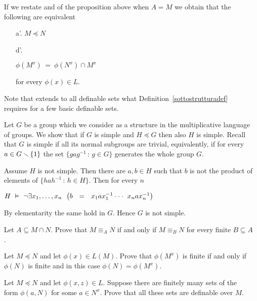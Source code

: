 If we restate  and  of the proposition above when $A=M$ we obtain that the following are equivalent
\begin{itemize}
\item[a'.] $M\preceq N$
\item[d'.] \parbox{26ex}{$\phi(M^x)\ =\ \phi(N^x) \cap M^x$} for every $\phi(x)\in L$.
\end{itemize}
Note that  extends to all definable sets what Definition~\ref{sottostrutturadef} requires for a few basic definable sets.

\begin{example}
Let $G$ be a group which we consider as a structure in the multiplicative language of groups.
We show that if $G$ is simple and $H\preceq G$ then also $H$ is simple.
Recall that $G$ is simple if all its normal subgroups are trivial, equivalently, if for every $a\in G\smallsetminus \{1\}$ the set $\big\{gag^{-1}\,:\,g\in G\big\}$ generates the whole group $G$.


Assume $H$ is not simple.
Then there are $a,b\in H$ such that $b$ is not the product of elements of $\big\{hah^{-1}\,:\,h\in H\big\}$.
Then for every $n$ 

\hfil$H\ \models\ \neg\E x_1,\dots,x_n\ \ \big(b\ \ =\ \ x_1ax_1^{-1}\cdot\cdot\cdot\ x_nax_n^{-1}\big)$

By elementarity the same hold in $G$.
Hence $G$ is not simple.
\end{example}


\begin{exercise}\label{ex_finitanaturaeqel}
Let $A\subseteq M\cap N$.
Prove that $M\equiv_A N$ if and only if $M\equiv_B N$ for every finite $B\subseteq A$.
\end{exercise}

\begin{exercise}\label{ex_finite_elemenrary}
Let $M\preceq N$ and let $\phi(x)\in L(M)$.
Prove that $\phi(M^x)$ is finite if and only if $\phi(N)$ is finite and in this case $\phi(N)=\phi(M^x)$.
\end{exercise}

\begin{exercise}\label{ex_finite_fam_sets}
Let $M\preceq N$ and let $\phi(x,z)\in L$.
Suppose there are finitely many sets of the form $\phi(a,N)$ for some $a\in N^x$.
Prove that all these sets are definable over $M$.
\end{exercise}

